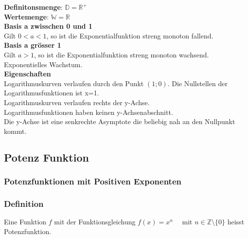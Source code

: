 \begin{multicols}{3}
\begin{center}
    \end{center}
    \textbf{Definitonsmenge}: $\mathbb{D} = \mathbb{R^+}$\\
    \textbf{Wertemenge}: $\mathbb{W} = \mathbb{R}$\\
    \textbf{Basis a zwisschen 0 und 1}\\
    Gilt $0 < a < 1$, so ist die Exponentialfunktion streng monoton fallend.\\
    \textbf{Basis a grösser 1}\\
    Gilt $a > 1$, so ist die Exponentialfunktion streng monoton wachsend. Exponentielles Wachstum.\\
    \textbf{Eigenschaften}\\
    Logarithmuskurven verlaufen durch den Punkt $(1;0)$.    Die Nullstellen der Logarithmusfunktionen ist x=1.\\
    Logarithmuskurven verlaufen rechts der y-Achse.\\
    Logarithmusfunktionen haben keinen y-Achsenabschnitt.\\
    Die y-Achse ist eine senkrechte Asymptote die beliebig nah an den Nullpunkt kommt.\\
    \subsection*{Potenz Funktion}
    \subsubsection*{Potenzfunktionen mit Positiven Exponenten}
    \subsubsection*{Definition}
    Eine Funktion $f$ mit der Funktionsgleichung $f(x) = x^n \quad \text{ mit } n \in \mathbb{Z}\setminus\{0\}$ heisst Potenzfunktion. \\~\\

\end{multicols}

